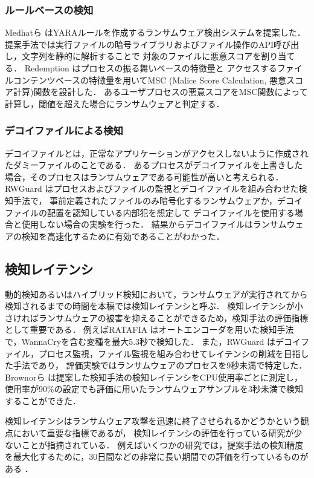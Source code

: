 \subsubsection{ルールベースの検知}
Medhatら \cite{yara-rule} はYARAルールを作成するランサムウェア検出システムを提案した．
提案手法では実行ファイルの暗号ライブラリおよびファイル操作のAPI呼び出し，文字列を静的に解析することで
対象のファイルに悪意スコアを割り当てる．
Redemption \cite{kharraz2017redemption} はプロセスの振る舞いベースの特徴量と
アクセスするファイルコンテンツベースの特徴量を用いてMSC (Malice Score Calculation, 悪意スコア計算)関数を設計した．
あるユーザプロセスの悪意スコアをMSC関数によって計算し，閾値を超えた場合にランサムウェアと判定する．

\subsubsection{デコイファイルによる検知}
デコイファイルとは，正常なアプリケーションがアクセスしないように作成されたダミーファイルのことである．
あるプロセスがデコイファイルを上書きした場合，そのプロセスはランサムウェアである可能性が高いと考えられる．
RWGuard \cite{mehnaz2018rwguard} はプロセスおよびファイルの監視とデコイファイルを組み合わせた検知手法で，
事前定義されたファイルのみ暗号化するランサムウェアか，デコイファイルの配置を認知している内部犯を想定して
デコイファイルを使用する場合と使用しない場合の実験を行った．
結果からデコイファイルはランサムウェアの検知を高速化するために有効であることがわかった．

\subsection{検知レイテンシ}
動的検知あるいはハイブリッド検知において，ランサムウェアが実行されてから検知されるまでの時間を本稿では検知レイテンシと呼ぶ．
検知レイテンシが小さければランサムウェアの被害を抑えることができるため，検知手法の評価指標として重要である．
例えばRATAFIA \cite{alam2019ratafia} はオートエンコーダを用いた検知手法で，WannaCryを含む変種を最大5.3秒で検知した．
また，RWGuard \cite{mehnaz2018rwguard} はデコイファイル，プロセス監視，ファイル監視を組み合わせてレイテンシの削減を目指した手法であり，
評価実験ではランサムウェアのプロセスを9秒未満で特定した．
Brownorら \cite{brownor2024ransomware} は提案した検知手法の検知レイテンシをCPU使用率ごとに測定し，
使用率が90\%の設定でも評価に用いたランサムウェアサンプルを3秒未満で検知することができた．

検知レイテンシはランサムウェア攻撃を迅速に終了させられるかどうかという観点において重要な指標であるが，
検知レイテンシの評価を行っている研究が少ないことが指摘されている\cite{alam2019ratafia}．
例えばいくつかの研究では，提案手法の検知精度を最大化するために，30日間などの非常に長い期間での評価を行っているものがある \cite{mitigation-modern}．

